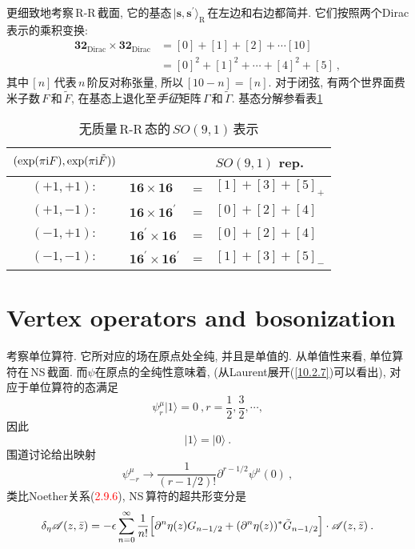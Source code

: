 更细致地考察\,R-R\,截面, 它的基态$\,\lvert\mathbf{s},\mathbf{s}^{\prime}\rangle_{\text{R}}\,$在左边和右边都简并. 它们按照两个Dirac表示的乘积变换:
\begin{align}
    \mathbf{32}_{\text{Dirac}}\times \mathbf{32}_{\text{Dirac}}
    &=[0]+[1]+[2]+\cdots[10] \nonumber \\
    &=[0]^{2}+[1]^{2}+\cdots +[4]^{2}+[5] \:, \label{10.2.25}
\end{align}
其中$\,[n]\,$代表$\,n\,$阶反对称张量, 所以$\,[10-n]=[n]$. 对于闭弦, 有两个世界面费米子数$\,F\,$和$\,\tilde{F}$, 在基态上退化至{\emph{手征}}矩阵$\,\Gamma\,$和$\,\tilde{\Gamma}$. 基态分解参看表\ref{tab:10.1}
\begin{table}[h]
\caption{无质量\,R-R\,态的$\,SO(9,1)\,$表示}
\label{tab:10.1}%
\centering
\begin{tabular}[c]{clcl}
\hline\hline
 $\vphantom{\Big[}(\exp(\pi\mathrm{i} F),\exp(\pi\mathrm{i}\tilde{F}))$ & & &$SO(9,1)$ rep.  \\
\hline
$(+1,+1):$& $ \mathbf{16}\times\mathbf{16} $ & = &  $[1]+[3]+[5]_{+}$\\
$(+1,-1):$& $ \mathbf{16}\times\mathbf{16}^{\prime}$ & = &  $[0]+[2]+[4]$\\
$(-1,+1):$& $ \mathbf{16}^{\prime}\times\mathbf{16} $ & = &  $[0]+[2]+[4]$\\
$(-1,-1):$& $ \mathbf{16}^{\prime}\times\mathbf{16}^{\prime} $ & = &  $[1]+[3]+[5]_{-}$ \\
 \hline\hline
\end{tabular}
\end{table}

\section{Vertex operators and bosonization}

考察单位算符. 它所对应的场在原点处全纯, 并且是单值的. 从单值性来看, 单位算符在\,NS\,截面. 而$\psi$在原点的全纯性意味着, (从Laurent展开(\ref{10.2.7})可以看出), 对应于单位算符的态满足
\begin{equation}
    \psi_{r}^{\mu} \lvert 1\rangle =0 \:, r=\frac{1}{2},\frac{3}{2},\cdots, \label{10.3.1}
\end{equation}
因此
\begin{equation}
    \lvert 1\rangle =\lvert 0\rangle \:. \label{10.3.2}
\end{equation}
围道讨论给出映射
\begin{equation}
    \psi_{-r}^{\mu} \to \frac{1}{(r-1/2)!}\partial^{r-1/2}\psi^{\mu}(0)\:, \label{10.3.3}
\end{equation}
类比Noether关系(\textcolor{red}{2.9.6}), NS\,算符的超共形变分是
\begin{equation}
    \delta_{\eta}\mathscr{A}(z,\bar{z})=-\epsilon \sum_{n=0}^{\infty}\frac{1}{n!}
    \Bigl[\partial^{n}\eta(z)G_{n-1/2}+(\partial^{n}\eta(z))^{\ast}\tilde{G}_{n-1/2}\Bigr]\cdot \mathscr{A}(z,\bar{z})\:. \label{10.3.4}
\end{equation}


